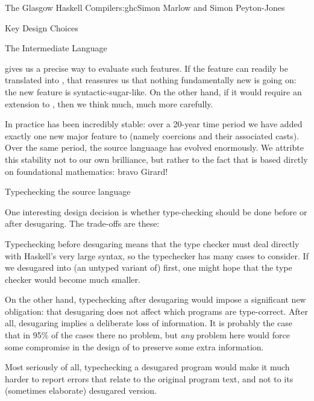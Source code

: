 \begin{aosachapter}{The Glasgow Haskell Compiler}{s:ghc}{Simon Marlow and Simon Peyton-Jones}
\begin{aosasect1}{Key Design Choices}
\begin{aosasect2}{The Intermediate Language}
\begin{aosaitemize}
   gives us a precise way to evaluate such features.  If
  the feature can readily be translated into , that
  reassures us that nothing fundamentally new is going on: the new
  feature is syntactic-sugar-like. On the other hand, if it would
  require an extension to , then we think much, much more
  carefully.

\end{aosaitemize}

In practice  has been incredibly stable: over a 20-year
time period we have added exactly one new major feature to 
(namely coercions and their associated casts).  Over the same period,
the source languaage has evolved enormously.  We attribte this
stability not to our own brilliance, but rather to the fact that
 is based dirctly on foundational mathematics: bravo
Girard!

\end{aosasect2}

\begin{aosasect2}{Typechecking the source language}

One interesting design decision is whether type-checking should be
done before or after desugaring.  The trade-offs are these:

\begin{aosaitemize}

\item Typechecking before desugaring means that the type checker must
  deal directly with Haskell's very large syntax, so the typechecker
  has many cases to consider.  If we desugared into (an untyped
  variant of)  first, one might hope that the type checker
  would become much smaller.

\item On the other hand, typechecking after desugaring would impose a
  significant new obligation: that desugaring does not affect which
  programs are type-correct.  After all, desugaring implies a
  deliberate loss of information.  It is probably the case that in
  95\% of the cases there no problem, but \emph{any} problem here
  would force some compromise in the design of  to preserve
  some extra information.

\item Most seriously of all, typechecking a desugared program would
  make it much harder to report errors that relate to the original
  program text, and not to its (sometimes elaborate) desugared
  version.


\end{aosaitemize}
\end{aosasect2}
\end{aosasect1}
\end{aosachapter}
